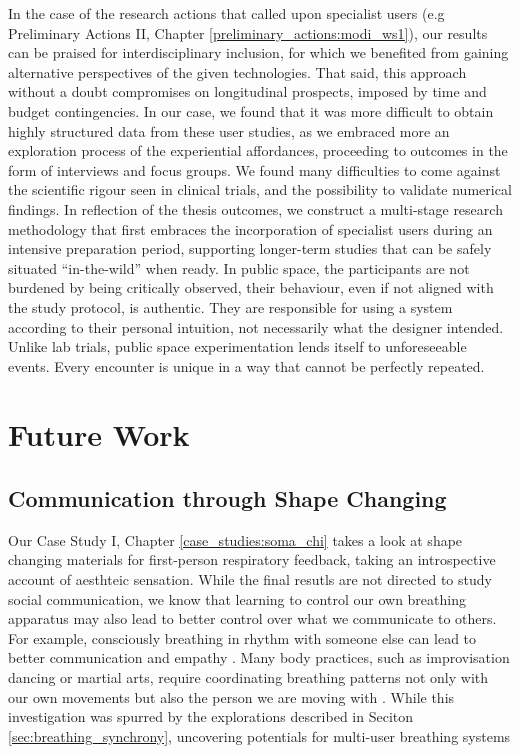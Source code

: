 In the case of the research actions that called upon specialist users (e.g Preliminary Actions II, Chapter \ref{preliminary_actions:modi_ws1}), our results can be praised for interdisciplinary inclusion, for which we benefited from gaining alternative perspectives of the given technologies. That said, this approach without a doubt compromises on longitudinal prospects, imposed by time and budget contingencies. In our case, we found that it was more difficult to obtain highly structured data from these user studies, as we embraced more an exploration process of the experiential affordances, proceeding to outcomes in the form of interviews and focus groups. We found many difficulties to come against the scientific rigour seen in clinical trials, and the possibility to validate numerical findings. In reflection of the thesis outcomes, we construct a multi-stage research methodology that first embraces the incorporation of specialist users during an intensive preparation period, supporting longer-term studies that can be safely situated “in-the-wild” when ready. In public space, the participants are not burdened by being critically observed, their behaviour, even if not aligned with the study protocol, is authentic. They are responsible for using a system according to their personal intuition, not necessarily what the designer intended. Unlike lab trials, public space experimentation lends itself to unforeseeable events. Every encounter is unique in a way that cannot be perfectly repeated.

\section{Future Work}

\subsection{Communication through Shape Changing}

Our Case Study I, Chapter \ref{case_studies:soma_chi} takes a look at shape changing materials for first-person respiratory feedback, taking an introspective account of aesthteic sensation. While the final resutls are not directed to study social communication, we know that learning to control our own breathing apparatus may also lead to better control over what we communicate to others. For example, consciously breathing in rhythm with someone else can lead to better communication and empathy \cite{keller_rhythm_2014}.
Many body practices, such as improvisation dancing or martial arts, require coordinating breathing patterns not only with our own movements but also the person we are moving with \cite{codrons_spontaneous_2014}. 
While this investigation was spurred by the explorations described in Seciton \ref{sec:breathing_synchrony}, uncovering potentials for multi-user breathing systems

